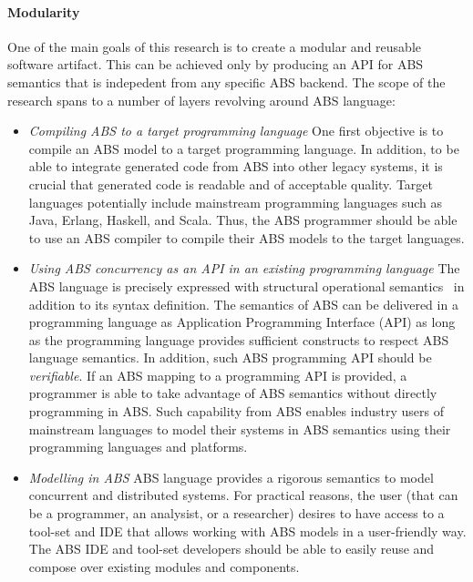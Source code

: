 \paragraph{Modularity} 
One of the main goals of this research is to create a modular and reusable
software artifact. 
This can be achieved only by producing an API for ABS semantics that is
indepedent from any specific ABS backend.
The scope of the research spans to a number of layers revolving around ABS
 language:
\begin{itemize}
\item \emph{Compiling ABS to a target programming language}
One first objective is to compile an ABS model to a target programming language.
In addition, to be able to integrate generated code from ABS into other legacy systems, it is crucial that generated code is readable and of acceptable quality.
Target languages potentially include mainstream programming languages such as
Java, Erlang, Haskell, and Scala.
Thus, the ABS programmer should be able to use an ABS compiler to compile
their ABS models to the target languages.
\item \emph{Using ABS concurrency as an API in an existing programming language}
The ABS language is precisely expressed with structural operational semantics~\cite{johnsen2012abs} in addition to its syntax definition.
The semantics of ABS can be delivered in a programming language
as Application Programming Interface (API) as long as the programming language provides sufficient constructs to respect ABS language semantics.
In addition, such ABS programming API should be \emph{verifiable}.
If an ABS mapping to a programming API is provided, a programmer is able to
take advantage of ABS semantics without directly programming in ABS.
Such capability from ABS enables industry users of mainstream languages to
model their systems in ABS semantics using their programming languages and
platforms.
\item \emph{Modelling in ABS}
ABS language provides a rigorous semantics to model concurrent
and distributed systems.
For practical reasons, the user (that can be a programmer, an analysist, or a researcher) 
desires to have access to a tool-set and IDE that allows working with ABS 
models in a user-friendly way.
The ABS IDE and tool-set developers should be able to easily reuse and compose
over existing modules and components.
\end{itemize}

